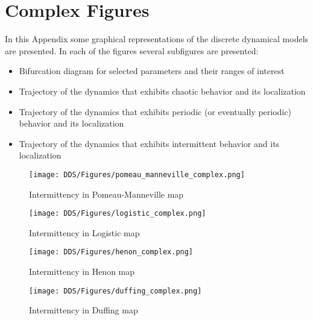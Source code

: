 \chapter{Complex Figures}
\label{sec:Appendix_complex_figures}
In this Appendix some graphical representations of the discrete dynamical models are presented.
In each of the figures several subfigures are presented:
\begin{itemize}
  \item Bifurcation diagram for selected parameters and their ranges of interest
  \item Trajectory of the dynamics that exhibits chaotic behavior and its localization
  \item Trajectory of the dynamics that exhibits periodic (or eventually periodic) behavior and its localization
  \item Trajectory of the dynamics that exhibits intermittent behavior and its localization
\end{itemize}

\begin{figure}[!ht]
	\centering
	\texttt{[image: DDS/Figures/pomeau\_manneville\_complex.png]}
	\caption{Intermittency in Pomeau-Manneville map}
	\label{fig:complex_pomeau_manneville}
\end{figure}

\begin{figure}[!ht]
	\centering
	\texttt{[image: DDS/Figures/logistic\_complex.png]}
	\caption{Intermittency in Logistic map}
	\label{fig:complex_logistic}
\end{figure}

\begin{figure}[!ht]
	\centering
	\texttt{[image: DDS/Figures/henon\_complex.png]}
	\caption{Intermittency in Henon map}
	\label{fig:complex_henon}
\end{figure}

\begin{figure}[!ht]
	\centering
	\texttt{[image: DDS/Figures/duffing\_complex.png]}
	\caption{Intermittency in Duffing map}
	\label{fig:complex_duffing}
\end{figure}

\endinput